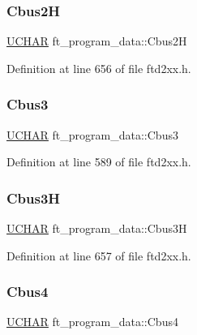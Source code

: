 \subsubsection{\texorpdfstring{Cbus2H}{Cbus2H}}
{\footnotesize\ttfamily \hyperlink{CatCaloProto40MHz_2inc_2WinTypes_8h_a4f4bb67531a9bf6f0b9c6ad76aeba587}{U\+C\+H\+AR} ft\+\_\+program\+\_\+data\+::\+Cbus2H}



Definition at line 656 of file ftd2xx.\+h.

\mbox{\label{structft__program__data_aba7bece422de482b850ee83df8603f05}} 
\subsubsection{\texorpdfstring{Cbus3}{Cbus3}}
{\footnotesize\ttfamily \hyperlink{CatCaloProto40MHz_2inc_2WinTypes_8h_a4f4bb67531a9bf6f0b9c6ad76aeba587}{U\+C\+H\+AR} ft\+\_\+program\+\_\+data\+::\+Cbus3}



Definition at line 589 of file ftd2xx.\+h.

\mbox{\label{structft__program__data_ae3df803a222da7e55590f14cb68b5a78}} 
\subsubsection{\texorpdfstring{Cbus3H}{Cbus3H}}
{\footnotesize\ttfamily \hyperlink{CatCaloProto40MHz_2inc_2WinTypes_8h_a4f4bb67531a9bf6f0b9c6ad76aeba587}{U\+C\+H\+AR} ft\+\_\+program\+\_\+data\+::\+Cbus3H}



Definition at line 657 of file ftd2xx.\+h.

\mbox{\label{structft__program__data_a4f360b07817acf1abd7277d7dff46cc6}} 
\subsubsection{\texorpdfstring{Cbus4}{Cbus4}}
{\footnotesize\ttfamily \hyperlink{CatCaloProto40MHz_2inc_2WinTypes_8h_a4f4bb67531a9bf6f0b9c6ad76aeba587}{U\+C\+H\+AR} ft\+\_\+program\+\_\+data\+::\+Cbus4}



